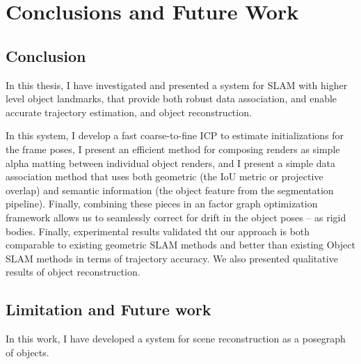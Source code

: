 
\chapter{Conclusions and Future Work} \label{chap:conclusion}

\section{Conclusion}
In this thesis, I have investigated and presented a system for SLAM with higher level object landmarks, that provide both robust data association, and enable accurate trajectory estimation, and object reconstruction.

In this system, I develop a fast coarse-to-fine ICP to estimate initializations for the frame poses, I present an efficient method for composing renders as simple alpha matting between individual object renders, and I present a simple data association method that uses both geometric (the IoU metric or projective overlap) and semantic information (the object feature from the segmentation pipeline). Finally, combining these pieces in an factor graph optimization framework allows us to seamlessly correct for drift in the object poses -- as rigid bodies. Finally, experimental results validated tht our approach is both comparable to existing geometric SLAM methods and better than existing Object SLAM methods in terms of trajectory accuracy. We also presented qualitative results of object reconstruction.

\section{Limitation and Future work}

In this work, I have developed a system for scene reconstruction as a posegraph of objects.

